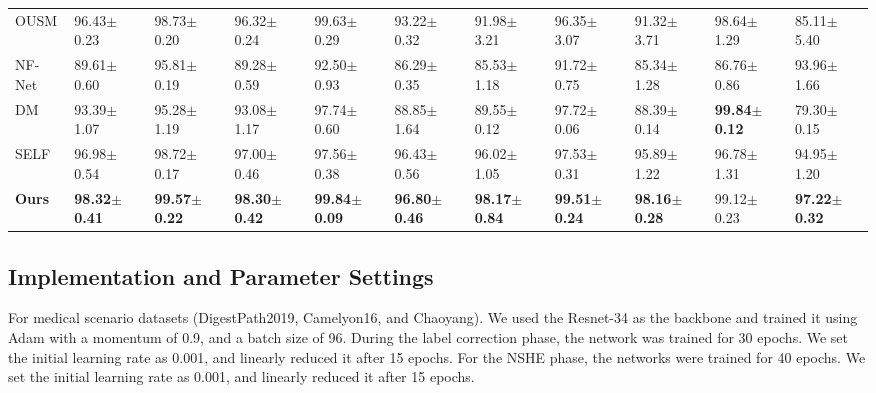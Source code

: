 \begin{table*}[]
\begin{tabular}{@{}lllllllllll@{}}
OUSM                       & 96.43$\pm$0.23          & 98.73$\pm$0.20          & 96.32$\pm$0.24               & 99.63$\pm$0.29          & 93.22$\pm$0.32             & 91.98$\pm$3.21          & 96.35$\pm$3.07          & 91.32$\pm$3.71               & 98.64$\pm$1.29          & 85.11$\pm$5.40             \\
NF-Net                          & 89.61$\pm$0.60          & 95.81$\pm$0.19          & 89.28$\pm$0.59               & 92.50$\pm$0.93          & 86.29$\pm$0.35             & 85.53$\pm$1.18          & 91.72$\pm$0.75          & 85.34$\pm$1.28               & 86.76$\pm$0.86          & 93.96$\pm$1.66             \\
DM                       & 93.39$\pm$1.07          & 95.28$\pm$1.19          & 93.08$\pm$1.17               & 97.74$\pm$0.60          & 88.85$\pm$1.64             & 89.55$\pm$0.12          & 97.72$\pm$0.06          & 88.39$\pm$0.14               & \textbf{99.84$\pm$0.12} & 79.30$\pm$0.15             \\
SELF                            & 96.98$\pm$0.54          & 98.72$\pm$0.17          & 97.00$\pm$0.46               & 97.56$\pm$0.38          & 96.43$\pm$0.56             & 96.02$\pm$1.05          & 97.53$\pm$0.31          & 95.89$\pm$1.22               & 96.78$\pm$1.31          & 94.95$\pm$1.20             \\
\textbf{Ours}                   & \textbf{98.32$\pm$0.41} & \textbf{99.57$\pm$0.22} & \textbf{98.30$\pm$0.42}      & \textbf{99.84$\pm$0.09} & \textbf{96.80$\pm$0.46}    & \textbf{98.17$\pm$0.84} & \textbf{99.51$\pm$0.24} & \textbf{98.16$\pm$0.28}      & 99.12$\pm$0.23          & \textbf{97.22$\pm$0.32}    \\ \bottomrule
\end{tabular}
\end{table*}

\subsection{Implementation and Parameter Settings}
\label{sec:impl}

For medical scenario datasets (DigestPath2019, Camelyon16, and Chaoyang). We used the Resnet-34 as the backbone and trained it using Adam with a momentum of 0.9, and a batch size of 96. During the label correction phase, the network was trained for 30 epochs. We set the initial learning rate as 0.001, and linearly reduced it after 15 epochs. For the NSHE phase, the networks were trained for 40 epochs. We set the initial learning rate as 0.001, and linearly reduced it after 15 epochs.

